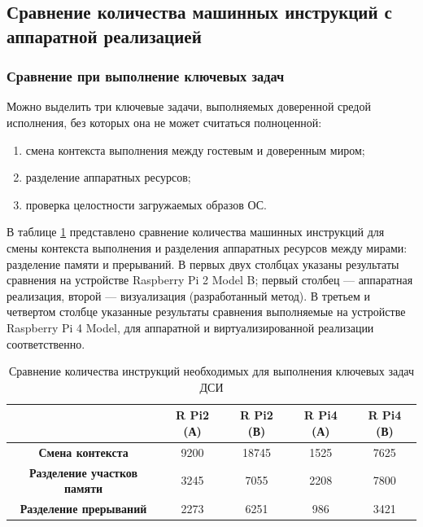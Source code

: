 \subsection{Сравнение количества машинных инструкций с аппаратной реализацией} 

\subsubsection{Сравнение при выполнение ключевых задач}

Можно выделить три ключевые задачи, выполняемых доверенной средой исполнения, без которых она не может считаться полноценной:

\begin{enumerate}[label*=\arabic*.]
	\item смена контекста выполнения между гостевым и доверенным миром;
	\item разделение аппаратных ресурсов;
	\item проверка целостности загружаемых образов ОС.
\end{enumerate}

В таблице \ref{table:perf-main-1} представлено сравнение количества машинных инструкций для смены контекста выполнения и разделения аппаратных ресурсов между мирами: разделение памяти и прерываний. В первых двух столбцах указаны результаты сравнения на устройстве Raspberry Pi 2 Model B; первый столбец --- аппаратная реализация, второй --- визуализация (разработанный метод). В третьем и четвертом столбце указанные результаты сравнения выполняемые на устройстве Raspberry Pi 4 Model, для аппаратной и виртуализированной реализации соответственно.

\begin{table}[!htb]
	\begin{center}
		\caption{Сравнение количества инструкций необходимых для выполнения ключевых задач ДСИ}
		\label{table:perf-main-1}
		\begin{tabular}{|c|c|c|c|c|}
			\hline
			& \bfseries R Pi2 (А) & \bfseries R Pi2 (В) & \bfseries R Pi4 (А) & \bfseries R Pi4 (В)\\
			\hline
			\bfseries Смена контекста & 9200 & 18745 & 1525 & 7625 \\ \hline
			\bfseries Разделение участков памяти & 3245 & 7055 & 2208 & 7800 \\ \hline
			\bfseries Разделение прерываний & 2273 & 6251 & 986 & 3421 \\ \hline	
		\end{tabular}
	\end{center}
\end{table}

